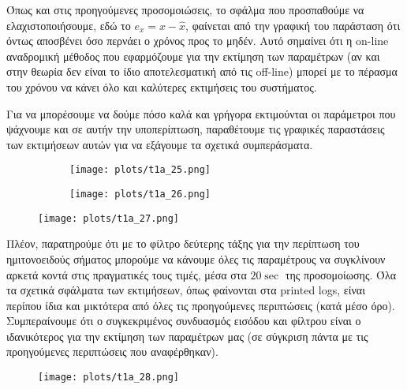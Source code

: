 \documentclass[12pt]{article} %
\numberwithin{equation}{section}  %
\begin{document}
\noindent Όπως και στις προηγούμενες προσομοιώσεις, το σφάλμα που προσπαθούμε να ελαχιστοποιήσουμε, εδώ το  $e_x = x -\hat{x}$, φαίνεται από την γραφική του παράσταση ότι όντως αποσβένει όσο περνάει ο χρόνος προς το μηδέν. Αυτό σημαίνει ότι η on-line αναδρομική μέθοδος που εφαρμόζουμε για την εκτίμηση των παραμέτρων (αν και στην θεωρία δεν είναι το ίδιο αποτελεσματική από τις off-line) μπορεί με το πέρασμα του χρόνου να κάνει όλο και καλύτερες εκτιμήσεις του συστήματος.


Για να μπορέσουμε να δούμε πόσο καλά και γρήγορα εκτιμούνται οι παράμετροι που ψάχνουμε και σε αυτήν την υποπερίπτωση, παραθέτουμε τις γραφικές παραστάσεις των εκτιμήσεων αυτών για να εξάγουμε τα σχετικά συμπεράσματα.

\begin{figure}[ht!]
    \begin{subfigure}{0.45\textwidth}
        \centering
        \texttt{[image: plots/t1a\_25.png]}
        \caption{}
        \label{fig:t1a_25}
    \end{subfigure}
    \hfill
    \begin{subfigure}{0.45\textwidth}
        \centering
        \texttt{[image: plots/t1a\_26.png]}
        \caption{}
        \label{fig:t1a_26}
    \end{subfigure}

\end{figure}

\begin{figure}[ht!]
    \centering
    \texttt{[image: plots/t1a\_27.png]}
    \caption{}
    \label{fig:t1a_27}
\end{figure}

Πλέον, παρατηρούμε ότι με το φίλτρο δεύτερης τάξης για την περίπτωση του ημιτονοειδούς σήματος μπορούμε να κάνουμε όλες τις παραμέτρους να συγκλίνουν αρκετά κοντά στις πραγματικές τους τιμές, μέσα στα $20\sec$ της προσομοίωσης. Όλα τα σχετικά σφάλματα των εκτιμήσεων, όπως φαίνονται στα printed logs, είναι περίπου ίδια και μικτότερα από όλες τις προηγούμενες περιπτώσεις (κατά μέσο όρο). Συμπεραίνουμε ότι ο συγκεκριμένος συνδυασμός εισόδου και φίλτρου είναι ο ιδανικότερος για την εκτίμηση των παραμέτρων μας (σε σύγκριση πάντα με τις προηγούμενες περιπτώσεις που αναφέρθηκαν). 

\begin{figure}[ht!]
    \centering
    \texttt{[image: plots/t1a\_28.png]}
    \caption{}
    \label{fig:t1a_28}
\end{figure}

\vspace{+100pt}



\newpage
\end{document}
